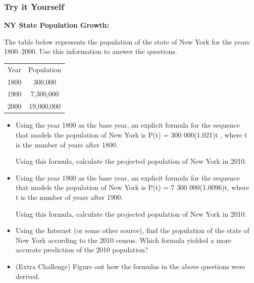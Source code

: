 \documentclass[notheorems
          ]
          {beamer}
\begin{document}
\begin{frame}
 \frametitle{ Try it Yourself  }
 
\scriptsize{  
 \textbf{ NY State Population Growth: } 
 
 The table below represents the population of the state of New York for the years 1800–2000. Use this information
to answer the questions.

\begin{center}
\begin{tabular}{cc}
Year & Population\\
1800 & 300,000\\
1900 & 7,300,000\\
2000 & 19,000,000
\end{tabular}
\end{center}

\begin{itemize}  [<*>] 
 \item Using the year 1800 as the base year, an explicit formula for the sequence that models the population of New
York is P(t) = 300 000(1.021)t , where t is the number of years after 1800.

Using this formula, calculate the projected population of New York in 2010.

 \item 
Using the year 1900 as the base year, an explicit formula for the sequence that models the population of New
York is P(t) = 7 300 000(1.0096)t, where t is the number of years after 1900.

Using this formula, calculate the projected population of New York in 2010.


 \item Using the Internet (or some other source), find the population of the state of New York according to the 2010
census. Which formula yielded a more accurate prediction of the 2010 population?

 \item (Extra Challenge) Figure out how the formulas in the above questions were derived. 
\end{itemize}

}
 
\end{frame}
\end{document}
